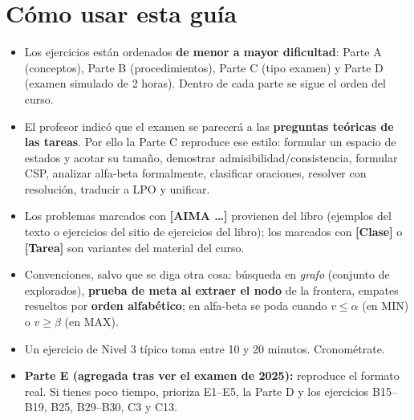 \tableofcontents
\newpage

\section*{Cómo usar esta guía}

\begin{itemize}
  \item Los ejercicios están ordenados \textbf{de menor a mayor dificultad}: Parte A (conceptos),
  Parte B (procedimientos), Parte C (tipo examen) y Parte D (examen simulado de 2 horas).
  Dentro de cada parte se sigue el orden del curso.
  \item El profesor indicó que el examen se parecerá a las \textbf{preguntas teóricas de las
  tareas}. Por ello la Parte C reproduce ese estilo: formular un espacio de estados y acotar su
  tamaño, demostrar admisibilidad/consistencia, formular CSP, analizar alfa-beta formalmente,
  clasificar oraciones, resolver con resolución, traducir a LPO y unificar.
  \item Los problemas marcados con \textbf{[AIMA …]} provienen del libro (ejemplos del texto o
  ejercicios del sitio de ejercicios del libro); los marcados con \textbf{[Clase]} o
  \textbf{[Tarea]} son variantes del material del curso.
  \item Convenciones, salvo que se diga otra cosa: búsqueda en \emph{grafo} (conjunto de
  explorados), \textbf{prueba de meta al extraer el nodo} de la frontera, empates resueltos por
  \textbf{orden alfabético}; en alfa-beta se poda cuando $v\le\alpha$ (en MIN) o $v\ge\beta$ (en MAX).
  \item Un ejercicio de Nivel 3 típico toma entre 10 y 20 minutos. Cronométrate.
  \item \textbf{Parte E (agregada tras ver el examen de 2025):} reproduce el formato real. Si tienes poco
  tiempo, prioriza E1–E5, la Parte D y los ejercicios B15–B19, B25, B29–B30, C3 y C13.
\end{itemize}


